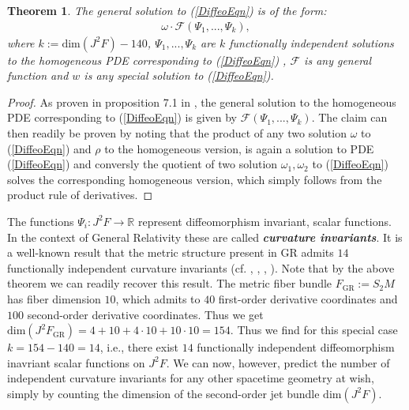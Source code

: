 \documentclass[%
 reprint,
nofootinbib,
 amsmath,amssymb,
 aps,
 prd,
floatfix,
]{revtex4-2}
\newtheorem{theorem}{Theorem}
\begin{document}
\begin{theorem}\label{FormalSol}
The general solution to (\ref{DiffeoEqn}) is of the form:
\begin{align}
    \omega \cdot \mathcal{F} \left (\Psi_1,...,\Psi_k \right ),
\end{align}
where $k:= \mathrm{dim}(J^2F) - 140$,  $\Psi_1,...,\Psi_k$ are $k$ functionally independent solutions to the homogeneous PDE corresponding to (\ref{DiffeoEqn}) , $\mathcal{F}$ is any general function and $w$ is any special solution to (\ref{DiffeoEqn}).
\end{theorem}
\begin{proof}
As proven in proposition 7.1 in \cite{seiler1994analysis}, the general solution to the homogeneous PDE corresponding to (\ref{DiffeoEqn}) is given by $\mathcal{F} \left (\Psi_1,...,\Psi_k \right )$. The claim can then readily be proven by noting that the product of any two solution $\omega$ to (\ref{DiffeoEqn}) and $\rho$ to the homogeneous version, is again a solution to PDE (\ref{DiffeoEqn}) and conversly the quotient of two solution $\omega_1,\omega_2$ to (\ref{DiffeoEqn}) solves the corresponding homogeneous version, which simply follows from the product rule of derivatives. \end{proof}

The functions $\Psi_i: J^2F \rightarrow \mathbb{R}$ represent diffeomorphism invariant, scalar functions. In the context of General Relativity these are called \textit{\textbf{curvature invariants}}. It is a well-known result that the metric structure present in GR admits $14$ functionally independent curvature invariants (cf. \cite{2009CQGra..26b5013C}, \cite{Zakhary1997}, \cite{2002IJMPD..11..827C}, \cite{doi:10.1063/1.531425}). 
Note that by the above theorem we can readily recover this result. The metric fiber bundle $F_{\text{GR}}:=S_2M$ has fiber dimension $10$, which admits to $40$ first-order derivative coordinates and $100$ second-order derivative coordinates. Thus we get $\mathrm{dim}(J^2F_{\text{GR}}) = 4+10+4\cdot10+10\cdot10 = 154$. Thus we find for this special case $k=154-140=14$, i.e., there exist $14$ functionally independent diffeomorphism inavriant scalar functions on $J^2F$. 
We can now, however, predict the number of independent curvature invariants for any other spacetime geometry at wish, simply by counting the dimension of the second-order jet bundle $\mathrm{dim}(J^2F)$.
\end{document}
